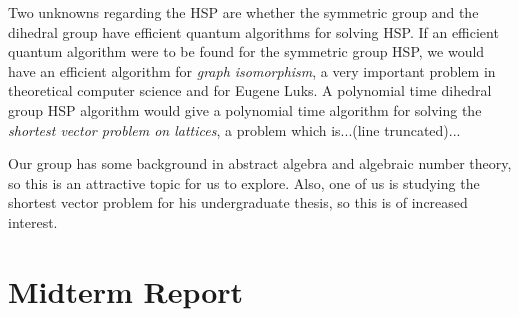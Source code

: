 \documentclass[dvips,12pt]{article}
\theoremstyle{plain}
\theoremstyle{definition}
\begin{document}
Two unknowns regarding the HSP are whether the symmetric group and the dihedral group have efficient quantum algorithms for solving HSP. If an efficient quantum algorithm were to be found for the symmetric group HSP, we would have an efficient algorithm for \emph{graph isomorphism}, a very important problem in theoretical computer science and for Eugene Luks. A polynomial time dihedral group HSP algorithm would give a polynomial time algorithm for solving the \emph{shortest vector problem on lattices}, a problem which is...(line truncated)...

Our group has some background in abstract algebra and algebraic number theory, so this is an attractive topic for us to explore. Also, one of us is studying the shortest vector problem for his undergraduate thesis, so this is of increased interest.\\
%

%
\section{Midterm Report}


\end{document}
